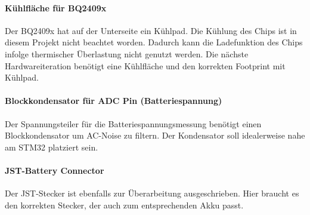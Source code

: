 \paragraph{Kühlfläche für BQ2409x}

Der BQ2409x hat auf der Unterseite ein Kühlpad. Die Kühlung des Chips ist in diesem Projekt nicht beachtet worden. Dadurch kann die Ladefunktion des Chips infolge thermischer Überlastung nicht genutzt werden. Die nächste Hardwareiteration benötigt eine Kühlfläche und den korrekten Footprint mit Kühlpad.

\paragraph{Blockkondensator für ADC Pin (Batteriespannung)}

Der Spannungsteiler für die Batteriespannungsmessung benötigt einen Blockkondensator um AC-Noise zu filtern. Der Kondensator soll idealerweise nahe am STM32 platziert sein.

\paragraph{JST-Battery Connector}

Der JST-Stecker ist ebenfalls zur Überarbeitung ausgeschrieben. Hier braucht es den korrekten Stecker, der auch zum entsprechenden Akku passt.




